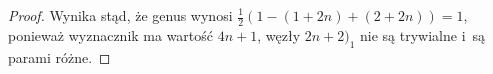 \begin{proof}
\begin{comment}
            \draw[semithick] (0,-10) circle (3);

            \draw[semithick] (-30, 15) to [out=left, in=up]   (-45, 0);
            \draw[semithick] (-30,-15) to [out=left, in=down] (-45, 0);
            \draw[semithick] (-30,  5) to [out=left, in=up]   (-35, 0);
            \draw[semithick] (-30, -5) to [out=left, in=down] (-35, 0);

            \draw[semithick] (30, 15) to [out=right, in=up]   (45,0);
            \draw[semithick] (30,-15) to [out=right, in=down] (45,0);
            \draw[semithick] (30,  5) to [out=right, in=up]   (35,0);
            \draw[semithick] (30, -5) to [out=right, in=down] (35,0);

            \draw[semithick] (-30, 15) to [out=right, in=up] (-20,10);
            \draw[semithick] (-30,  5) to [out=right, in=down] (-20,10);

            \draw[semithick] (30, 15) to [out=left, in=up] (20,10);
            \draw[semithick] (30,  5) to [out=left, in=down] (20,10);

            \draw[semithick] (-10, 10) circle (5);
            \draw[semithick] (10,  10) circle (5);
        \end{tikzpicture}
    \]
\end{comment}
    Wynika stąd, że genus wynosi $\frac 12 (1 - (1+2n) + (2+2n)) = 1$, ponieważ wyznacznik ma wartość $4n+1$,
    węzły $2n+2)_1$ nie są trywialne i~są parami różne.
\end{proof}

